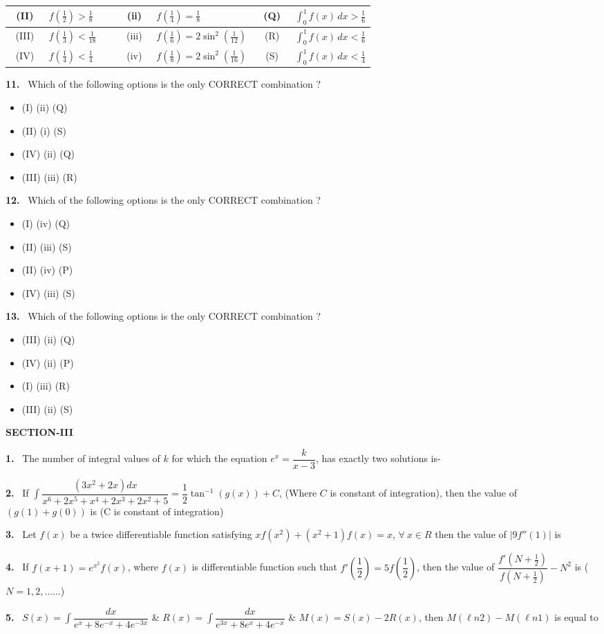 \documentclass[10pt]{extarticle}
\newcommand{\sect}[1]{\par\smallskip\noindent\textbf{#1}\par}
\newcommand{\qn}[1]{\par\smallskip\noindent\textbf{#1.}~}
\newenvironment{qoptions}{\begin{itemize}[leftmargin=1.8em,itemsep=1pt,topsep=2pt,label={}]}{\end{itemize}}
\newcommand{\opt}[2]{\item[(#1)] #2}
\begin{document}
\begin{multicols}{2}
{\begin{tabular}{|c|p{0.2\linewidth}|c|p{0.28\linewidth}|c|p{0.22\linewidth}|}
(II) & $f\!\left(\frac12\right)>\frac18$ & (ii) & $f\!\left(\frac14\right)=\frac18$ & (Q) & $\displaystyle\int_0^1f(x)\,dx>\frac16$\\ \hline
(III) & $f\!\left(\frac13\right)<\frac1{18}$ & (iii) & $f\!\left(\frac16\right)=2\sin^2\!\left(\frac1{12}\right)$ & (R) & $\displaystyle\int_0^1f(x)\,dx<\frac16$\\ \hline
(IV) & $f\!\left(\frac14\right)<\frac14$ & (iv) & $f\!\left(\frac18\right)=2\sin^2\!\left(\frac1{16}\right)$ & (S) & $\displaystyle\int_0^1f(x)\,dx<\frac14$\\ \hline
\end{tabular}}\par
\qn{11} Which of the following options is the only CORRECT combination ?
\begin{qoptions}
\opt{A}{(I) (ii) (Q)}
\opt{B}{(II) (i) (S)}
\opt{C}{(IV) (ii) (Q)}
\opt{D}{(III) (iii) (R)}
\end{qoptions}
\qn{12} Which of the following options is the only CORRECT combination ?
\begin{qoptions}
\opt{A}{(I) (iv) (Q)}
\opt{B}{(II) (iii) (S)}
\opt{C}{(II) (iv) (P)}
\opt{D}{(IV) (iii) (S)}
\end{qoptions}
\qn{13} Which of the following options is the only CORRECT combination ?
\begin{qoptions}
\opt{A}{(III) (ii) (Q)}
\opt{B}{(IV) (ii) (P)}
\opt{C}{(I) (iii) (R)}
\opt{D}{(III) (ii) (S)}
\end{qoptions}
\sect{SECTION-III}
\qn{1} The number of integral values of $k$ for which the equation $e^x=\dfrac{k}{x-3}$, has exactly two solutions is-
\qn{2} If $\displaystyle\int\dfrac{(3x^2+2x)dx}{x^6+2x^5+x^4+2x^3+2x^2+5}=\dfrac12\tan^{-1}(g(x))+C$, (Where $C$ is constant of integration), then the value of $(g(1)+g(0))$ is (C is constant of integration)
\qn{3} Let $f(x)$ be a twice differentiable function satisfying $xf(x^2)+(x^2+1)f(x)=x$, $\forall\ x\in R$ then the value of $|9f''(1)|$ is
\qn{4} If $f(x+1)=e^{x^2}f(x)$, where $f(x)$ is differentiable function such that $f'\!\left(\dfrac12\right)=5f\!\left(\dfrac12\right)$, then the value of $\dfrac{f'\left(N+\frac12\right)}{f\left(N+\frac12\right)}-N^2$ is ($N=1,2,\ldots\ldots$)
\qn{5} $S(x)=\displaystyle\int\dfrac{dx}{e^x+8e^{-x}+4e^{-3x}}$ \& $R(x)=\displaystyle\int\dfrac{dx}{e^{3x}+8e^x+4e^{-x}}$ \& $M(x)=S(x)-2R(x)$, then $M(\ell n2)-M(\ell n1)$ is equal to
\end{multicols}
\end{document}
